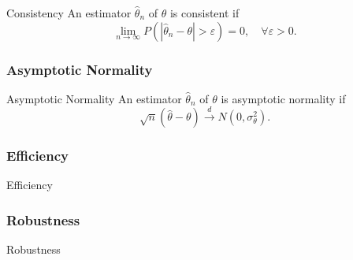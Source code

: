 \begin{definition}{Consistency}{}
    An estimator $\hat{\theta}_n$ of $\theta$ is consistent if
    \begin{equation}
        \lim_{n\rightarrow\infty}P\left(\left|\hat{\theta}_n-\theta\right|>\varepsilon\right)=0,\quad\forall\varepsilon>0.
    \end{equation}
\end{definition}

\begin{example}

\end{example}

\begin{example}

\end{example}

\subsubsection*{Asymptotic Normality}

\begin{definition}{Asymptotic Normality}{}
    An estimator $\hat{\theta}_n$ of $\theta$ is asymptotic normality if
    \begin{equation}
        \sqrt{n}\left(\hat{\theta}-\theta\right)\stackrel{d}{\rightarrow}N\left(0,\sigma_{\theta}^{2}\right).
    \end{equation}
\end{definition}

\subsubsection*{Efficiency}

\begin{definition}{Efficiency}{}

\end{definition}

\subsubsection*{Robustness}

\begin{definition}{Robustness}{}

\end{definition}
